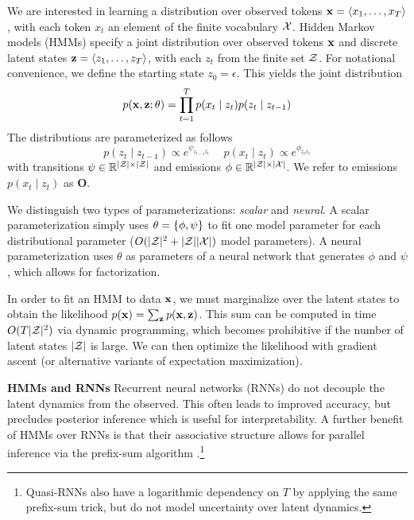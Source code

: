 \documentclass[11pt,a4paper]{article}
\begin{document}
We are interested in learning a distribution over observed tokens
$\mathbf{x} = \langle x_1, \ldots, x_T \rangle$, with each token $x_t$
an element of the finite vocabulary $\mathcal{X}$.
Hidden Markov models (HMMs) specify a joint distribution over 
observed tokens $\mathbf{x}$ and discrete latent states $\mathbf{z} = \langle z_1, \ldots, z_T \rangle$,
with each $z_t$ from the finite set $\mathcal{Z}$.
For notational convenience, we define the starting state $z_0=\epsilon$.
This yields the joint distribution
\begin{equation}
p(\mathbf{x}, \mathbf{z}; \theta)
= \prod_{t=1}^T p(x_t\mid z_t)p(z_t \mid z_{t-1})
\end{equation}
\noindent The distributions are parameterized as follows
\begin{equation}
\label{param}
p(z_t \mid z_{t-1}) \propto e^{\psi_{z_{t-1}z_t}} \quad \ p(x_t \mid z_t) \propto e^{\phi_{z_tx_t}}
\end{equation}
with transitions $\psi \in \mathbb{R}^{|\mathcal{Z}|\times|\mathcal{Z}|}$
and emissions $\phi \in \mathbb{R}^{|\mathcal{Z}| \times |\mathcal{X}|}$.
We refer to emissions $p(x_t \mid z_t)$ as $\mathbf{O}$.

We distinguish two types of parameterizations: \textit{scalar} and \textit{neural}.
A scalar parameterization simply uses $\theta = \left\{\phi,\psi\right\}$ to fit one model parameter for
each distributional parameter ($O(|\mathcal{Z}|^2 + |\mathcal{Z}||\mathcal{X}|)$ model parameters).
A neural parameterization uses $\theta$ as parameters of a neural network
that generates $\phi$ and $\psi$, which allows for factorization. 

In order to fit an HMM to data $\mathbf{x}$,
we must marginalize over the latent states to obtain the likelihood
$p(\mathbf{x}) = \sum_{\mathbf{z}}p(\mathbf{x},\mathbf{z})$.
This sum can be computed in time $O(T|\mathcal{Z}|^2)$ via dynamic programming,
which becomes prohibitive if the number of latent states $|\mathcal{Z}|$ is large.
We can then optimize the likelihood 
with gradient ascent (or alternative variants of expectation maximization).

\noindent \textbf{HMMs and RNNs}
Recurrent neural networks (RNNs) do not decouple the latent dynamics from the observed.
This often leads to improved accuracy,
but precludes posterior inference which is useful for interpretability.
A further benefit of HMMs over RNNs is that
their associative structure allows for parallel inference
via the prefix-sum algorithm \cite{ladner1980prefix}.\footnote{
Quasi-RNNs \citep{bradbury2016qrnn} also have a logarithmic dependency on $T$
by applying the same prefix-sum trick, but do not model uncertainty over
latent dynamics.}
\end{document}
